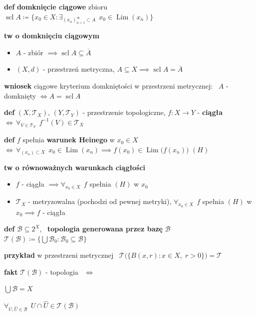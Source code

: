 \documentclass[a4paper,12pt]{article}
\begin{document}
\bigskip
\textbf{def} \; \textbf{domknięcie ciągowe} zbioru \, \(\operatorname{scl} A \coloneqq \{x_0 \in X : \exists_{(x_n)_{n=1}^{\infty} \subset A} \;\, x_0 \in \operatorname{Lim}(x_n)\}\)

\smallskip
\textbf{tw o domknięciu ciągowym}
\begin{itemize}
    \item \(A\) - zbiór \(\implies \operatorname{scl} A \subseteq \overline{A}\)
    \item \((X, d)\) - przestrzeń metryczna, \; \(A \subseteq X \implies \operatorname{scl} A = \overline{A}\)
\end{itemize}

\smallskip
\textbf{wniosek} \; ciągowe kryterium domkniętości w przestrzeni metrycznej: \, \(A\) - domknięty \(\iff A = \operatorname{scl} A\)

\bigskip
\textbf{def} \; \((X, \mathcal{T}_X), \, (Y, \mathcal{T}_Y)\) - przestrzenie topologiczne, \; \(f: X \to Y\) - \textbf{ciągła} \, \(\iff \, \forall_{V \in \mathcal{T}_Y} \;\, f^{-1}(V) \in \mathcal{T}_X\)

\bigskip
\textbf{def} \; \(f\) spełnia \textbf{warunek Heinego} w \(x_0 \in X\) \, \(\iff \, \forall_{(x_n) \subset X} \;\, x_0 \in \operatorname{Lim}(x_n) \implies f(x_0) \in \operatorname{Lim}\big(f(x_n)\big)\) \; \((H)\)

\smallskip
\textbf{tw o równoważnych warunkach ciągłości}
\begin{itemize}
    \item \(f\) - ciągła \(\implies \forall_{x_0 \in X} \;\, f\) spełnia \((H)\) w \(x_0\)
    \item \(\mathcal{T}_X\) - metryzowalna (pochodzi od pewnej metryki), \; \(\forall_{x_0 \in X} \;\, f\) spełnia \((H)\) w \(x_0 \implies f\) - ciągła
\end{itemize}

\newpage
\textbf{def} \; \(\mathcal{B} \subseteq 2^X\), \, \textbf{topologia generowana przez bazę} \(\mathcal{B}\) \, \(\mathcal{T}(\mathcal{B}) \coloneqq \{\bigcup \mathcal{B}_0 : \mathcal{B}_0 \subseteq \mathcal{B}\}\)

\bigskip
\begin{logbox}
\textbf{przykład} \; w przestrzeni metrycznej \, \(\mathcal{T}\big(\{B(x, r) : x \in X, \; r > 0\}\big) = \mathcal{T}\)
\end{logbox}

\bigskip
\textbf{fakt} \; \(\mathcal{T}(\mathcal{B})\) - topologia \, \(\iff\)
\begin{podpunkty}
    \item \(\displaystyle\bigcup \mathcal{B} = X\)
    \item \(\forall_{U, \hat{U} \in \mathcal{B}} \;\, U \cap \hat{U} \in \mathcal{T}(\mathcal{B})\)
\end{podpunkty}
\end{document}

